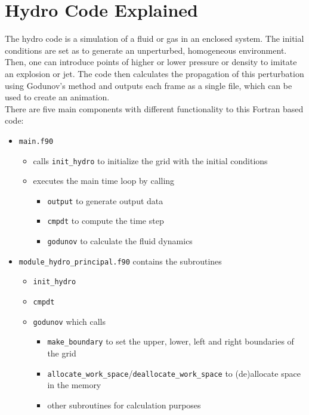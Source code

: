 \documentclass[12pt, a4paper, titlepage]{article}
\begin{document}
\newpage
\clearpage
\thispagestyle{plain}
\setcounter{page}{1}
{\pagestyle{plain}
\tableofcontents\label{toc}
\clearpage
{}
\setcounter{page}{1}




\newpage
\section{Hydro Code Explained}

The hydro code is a simulation of a fluid or gas in an enclosed system. The initial conditions are set as to generate an unperturbed, homogeneous environment. Then, one can introduce points of higher or lower pressure or density to imitate an explosion or jet. The code then calculates the propagation of this perturbation using Godunov's method and outputs each frame as a single file, which can be used to create an animation.\\

There are five main components with different functionality to this Fortran based code:
\begin{itemize}
	\item \texttt{main.f90}
	\begin{itemize}
		\item calls \texttt{init\_hydro} to initialize the grid with the initial conditions
		\item executes the main time loop by calling
		\begin{itemize}
		\item \texttt{output} to generate output data
		\item \texttt{cmpdt} to compute the time step
		\item \texttt{godunov} to calculate the fluid dynamics
		\end{itemize}
	\end{itemize}
	\item \texttt{module\_hydro\_principal.f90} contains the subroutines
	\begin{itemize}
		\item \texttt{init\_hydro}
		\item \texttt{cmpdt}
		\item \texttt{godunov} which calls
		\begin{itemize}
				\item \texttt{make\_boundary} to set the upper, lower, left and right boundaries of the grid
				\item \texttt{allocate\_work\_space}/\texttt{deallocate\_work\_space} to (de)allocate space in the memory
				\item other subroutines for calculation purposes
			

\end{itemize}
\end{itemize}
\end{itemize}}
\end{document}
